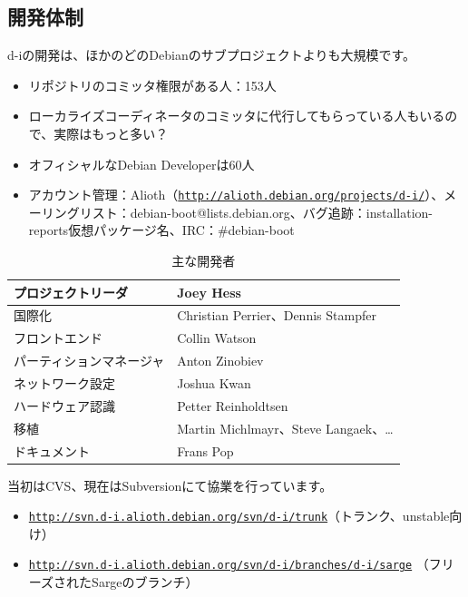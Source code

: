 \documentclass[mingoth,a4paper]{jsarticle}
\begin{document}
\subsection{開発体制}
\label{sec:devel}

d-iの開発は、ほかのどのDebianのサブプロジェクトよりも大規模です。

\begin{itemize}
\item リポジトリのコミッタ権限がある人：153人
\item ローカライズコーディネータのコミッタに代行してもらっている人もいるので、実際はもっと多い？
\item オフィシャルなDebian Developerは60人
\item アカウント管理：Alioth（\texttt{\url{http://alioth.debian.org/projects/d-i/}}）、メーリングリスト：debian-boot@lists.debian.org、バグ追跡：installation-reports仮想パッケージ名、IRC：\#debian-boot
\end{itemize}

\begin{table}[htbp]
  \begin{tabular}[htbp]{|l|p{8cm}|}\hline
    プロジェクトリーダ&Joey Hess\\ \hline
    国際化&Christian Perrier、Dennis Stampfer\\ \hline
    フロントエンド&Collin Watson\\ \hline
    パーティションマネージャ&Anton Zinobiev\\ \hline
    ネットワーク設定&Joshua Kwan\\ \hline
    ハードウェア認識&Petter Reinholdtsen\\ \hline
    移植&Martin Michlmayr、Steve Langaek、…\\ \hline
    ドキュメント&Frans Pop\\ \hline
  \end{tabular}
  \caption{主な開発者}
  \label{tab:core}
\end{table}

当初はCVS、現在はSubversionにて協業を行っています。

\begin{itemize}
\item \texttt{\url{http://svn.d-i.alioth.debian.org/svn/d-i/trunk}}（トランク、unstable向け）
\item \texttt{\url{http://svn.d-i.alioth.debian.org/svn/d-i/branches/d-i/sarge}} （フリーズされたSargeのブランチ）
\end{itemize}
\end{document}

